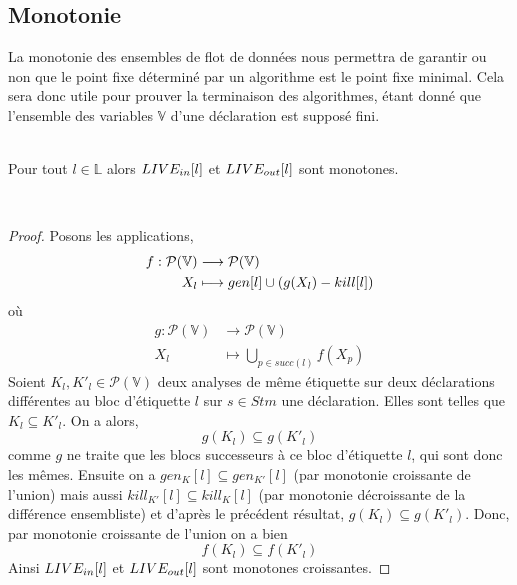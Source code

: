 \documentclass[a4paper, 10pt]{article}
\begin{document}
\subsection{Monotonie}
La monotonie des ensembles de flot de données nous permettra de garantir ou non que le point fixe déterminé par un
algorithme est le point fixe minimal. 
Cela sera donc utile pour prouver la terminaison des algorithmes, étant donné que l'ensemble des variables $\mathbb{V}$ d'une déclaration est supposé fini.
\\
\\
\begin{lemma}
	Pour tout $l \in \mathbb{L}$ alors $LIVE_{in}[l]$ et $LIVE_{out}[l]$ sont monotones.
\end{lemma}
\\
\begin{proof}	
Posons les applications,
\begin{align*}
	f : \mathcal{P}(\mathbb{V}) &\longrightarrow \mathcal{P}(\mathbb{V}) \\
	X_l &\longmapsto gen[l] \cup (g(X_l) - kill[l])
\end{align*}
où
\begin{align*}
	g : \mathcal{P}(\mathbb{V}) &\longrightarrow \mathcal{P}(\mathbb{V})\\
	X_l &\longmapsto \bigcup\limits_{p\in succ(l)} f(X_p)
\end{align*}
Soient $K_l, K'_l \in \mathcal{P}(\mathbb{V})$ deux analyses de même étiquette sur deux déclarations différentes au bloc
d'étiquette $l$ sur $s \in Stm$ une déclaration. Elles sont telles que $K_l \subseteq K'_l$. On a alors,
\[
	g(K_l) \subseteq g(K'_l)
\]
comme $g$ ne traite que les blocs successeurs à ce bloc d'étiquette $l$, qui sont donc les mêmes.
Ensuite on a $gen_K[l] \subseteq gen_{K'}[l]$ (par monotonie croissante de l'union) mais aussi $kill_{K'}[l] \subseteq kill_K[l]$ (par monotonie décroissante
de la différence ensembliste) et d'après le précédent
résultat, $g(K_l) \subseteq g(K'_l)$. Donc, par monotonie croissante de l'union on a bien
\[
	f(K_l) \subseteq f(K'_l)	
\]
Ainsi $LIVE_{in}[l]$ et $LIVE_{out}[l]$ sont monotones croissantes.
\end{proof}
\end{document}
